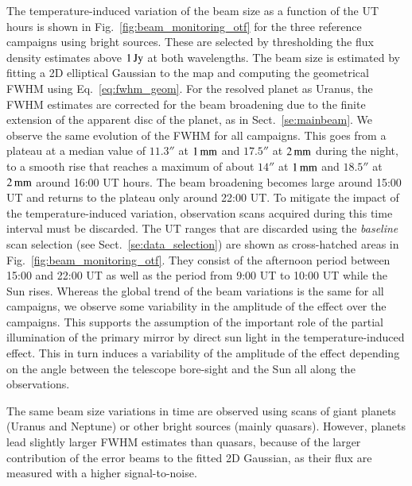 The temperature-induced variation of the beam size as a function of
the UT hours is shown in Fig.~\ref{fig:beam_monitoring_otf} for the
three reference campaigns using bright sources. These are
selected by thresholding the flux density estimates above $1\,\rm{Jy}$
at both wavelengths. The beam size is estimated by fitting a 2D
elliptical Gaussian to the map {\lp and computing the geometrical FWHM
using Eq.~\ref{eq:fwhm_geom}.} For the resolved planet as Uranus, the
FWHM estimates are corrected for the beam broadening due to the finite
extension of the apparent disc of the planet, as in
Sect.~\ref{se:mainbeam}.
We observe the same evolution of
the FWHM for all campaigns. 
This goes from a plateau at a median value of $11.3''$ at $1\,\rm{mm}$
and $17.5''$ at $2\,\rm{mm}$ during the night, to a smooth rise that
reaches a maximum of about $14''$ at $1\,\rm{mm}$ and $18.5''$ at
$2\,\rm{mm}$ around 16:00 UT hours. The beam broadening becomes large
around 15:00 UT and returns to the plateau only around 22:00 UT.
To mitigate the impact of the temperature-induced variation,
observation scans acquired during this time interval must be
discarded. The UT ranges that are discarded
using the \emph{baseline} scan selection (see
Sect.~\ref{se:data_selection}) are shown as cross-hatched areas in
Fig.~\ref{fig:beam_monitoring_otf}.
They consist of the afternoon
period between 15:00 and 22:00 UT %
as well as the period from 9:00 UT to 10:00 UT while the Sun
rises. 
{\lp Whereas the global trend of the beam variations is the
same for all campaigns, we observe some variability in the amplitude
of the effect over the campaigns. This supports the assumption of the
important role of the partial illumination of the primary mirror by
direct sun light in the temperature-induced effect. This in turn
induces a variability of the amplitude of the effect depending on the
angle between the telescope bore-sight %
and the Sun all along the
observations.}

The same beam size variations in time are observed using scans of giant planets
(Uranus and Neptune) or other bright
sources (mainly quasars). However, planets lead slightly larger FWHM
estimates than quasars, because of
the larger contribution of the error beams to the fitted 2D Gaussian,
as their flux are measured with a higher signal-to-noise.

